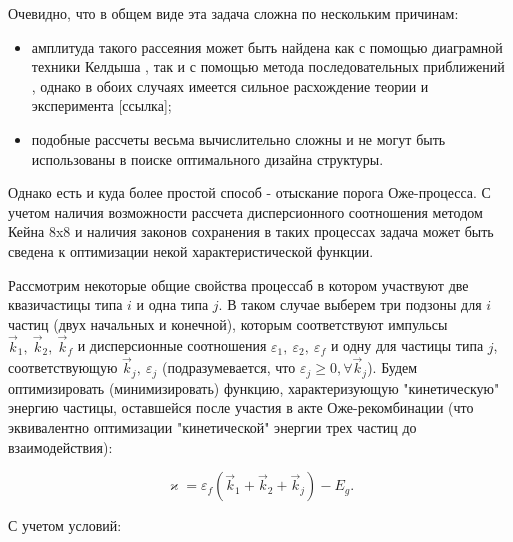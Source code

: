 \documentclass[../main.tex]{subfiles}
\begin{document}
        Очевидно, что в общем виде эта задача сложна по нескольким причинам:
        \begin{itemize}
            \item амплитуда такого рассеяния может быть найдена как с
                помощью диаграмной техники Келдыша \cite{AugerDiagrams}, 
                так и с помощью метода последовательных приближений \cite{SucApprAnd, SucApprAgr},
                однако в обоих случаях имеется сильное расхождение
                теории и эксперимента [ссылка];
            \item подобные рассчеты весьма вычислительно сложны и не могут
                быть использованы в поиске оптимального дизайна структуры.
        \end{itemize}

        Однако есть и куда более простой способ - отыскание порога Оже-процесса.
        С учетом наличия возможности рассчета дисперсионного соотношения методом Кейна 8x8
        \cite{HgCdTeCalcZholudev} и наличия законов сохранения в таких
        процессах задача может быть сведена к оптимизации некой характеристической
        функции.

        Рассмотрим некоторые общие свойства процессаб в котором участвуют две
        квазичастицы типа $i$ и одна типа $j$. В таком случае выберем три подзоны для 
        $i$ частиц (двух начальных и конечной), которым соответствуют импульсы 
        $\vec{k}_1,~\vec{k}_2,~\vec{k}_f$ и дисперсионные 
        соотношения $\varepsilon_1,~\varepsilon_2,~\varepsilon_f$ и одну для частицы типа $j$,
        соответствующую $\vec{k}_j,~\varepsilon_j$ (подразумевается, что 
        $\varepsilon_j \geq 0, \forall \vec{k}_j$). Будем оптимизировать (минимизировать) функцию, 
        характеризующую "кинетическую" энергию частицы, оставшейся после участия в акте Оже-рекомбинации 
        (что эквивалентно оптимизации "кинетической" энергии трех частиц до взаимодействия):
        
        \begin{equation}
            \varkappa = \varepsilon_f(\vec{k}_1 + \vec{k}_2 + \vec{k}_j) - E_g.
        \end{equation}

        С учетом условий:
\end{document}
